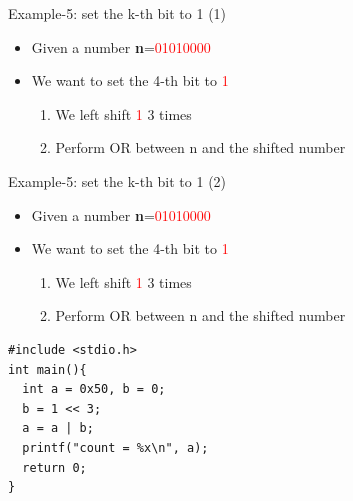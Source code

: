 \begin{frame}{Example-5: set the k-th bit to 1 (1)}
\begin{itemize}
	\item {Given a number \textbf{n}=\textcolor{red}{01010000}}
	\item {We want to set the 4-th bit to \textcolor{red}{1}}
	\begin{enumerate}
		\item {We left shift \textcolor{red}{1}  3 times}
		\item {Perform OR between n and the shifted number}
	\end{enumerate}
\end{itemize}

\end{frame}

\begin{frame}[fragile]{Example-5: set the k-th bit to 1 (2)}
\begin{itemize}
	\item {Given a number \textbf{n}=\textcolor{red}{01010000}}
	\item {We want to set the 4-th bit to \textcolor{red}{1}}
	\begin{enumerate}
		\item {We left shift \textcolor{red}{1}  3 times}
		\item {Perform OR between n and the shifted number}
	\end{enumerate}
\end{itemize}
\begin{lstlisting}[linewidth=0.7\linewidth]
#include <stdio.h>
int main(){
  int a = 0x50, b = 0;
  b = 1 << 3;
  a = a | b;
  printf("count = %x\n", a);
  return 0;
}
\end{lstlisting}
\end{frame}
